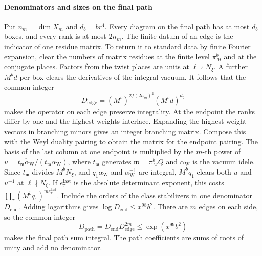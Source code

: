 \paragraph{Denominators and sizes on the final path}
Put \(n_m=\dim X_m\) and \(d_b=b r^4\). Every diagram on the final path
has at most \(d_b\) boxes, and every rank is at most \(2n_m\).
The finite datum of an edge is the indicator of one residue matrix.
To return it to standard data by finite Fourier expansion, clear
the numbers of matrix residues at the finite level \(\pi_M^b\) and
at the conjugate places. Factors from the twist places are units
at \(\ell\nmid N_\xi\). A further \(M^b d\) per box clears the
derivatives of the integral vacuum. It follows that the common
integer
\[
 D_\mathrm{edge}=(M^b)^{2f(2n_m)^2}(M^b d)^{d_b}
\]
makes the operator on each edge preserve integrality.
At the endpoint the ranks differ by one and the highest weights
interlace. Expanding the highest weight vectors in branching minors
gives an integer branching matrix. Compose this with the Weyl
duality pairing to obtain the matrix for the endpoint pairing.
The basis of the last column at one endpoint is multiplied by
the \(m\)-th power of
\(u=\overline{t_{\mathfrak m}\alpha_\mathrm{W}}/(t_{\mathfrak m}\alpha_\mathrm{W})\),
where \(t_{\mathfrak m}\) generates \(\mathfrak m=\pi_M^bQ\) and
\(\alpha_\mathrm{W}\) is the vacuum idele. Since \(t_{\mathfrak m}\)
divides \(M^b N_\xi\), and \(q_1\alpha_\mathrm{W}\) and
\(\alpha_\mathrm{W}^{-1}\) are integral, \(M^b q_1\) clears both \(u\)
and \(u^{-1}\) at \(\ell\nmid N_\xi\). If \(e_\tau^\mathrm{last}\)
is the absolute determinant exponent, this costs
\(\prod_\tau(M^b q_1)^{m e_\tau^\mathrm{last}}\).
Include the orders of the class stabilizers in one denominator
\(D_\mathrm{end}\). Adding logarithms gives \(\log D_\mathrm{end}\le x^{98}b^2\).
There are \(m\) edges on each side, so the common integer
\[
 D_\mathrm{path}=D_\mathrm{end}D_\mathrm{edge}^{2m}
       \le \exp(x^{99}b^2)
\]
makes the final path sum integral. The path coefficients are sums
of roots of unity and add no denominator.

